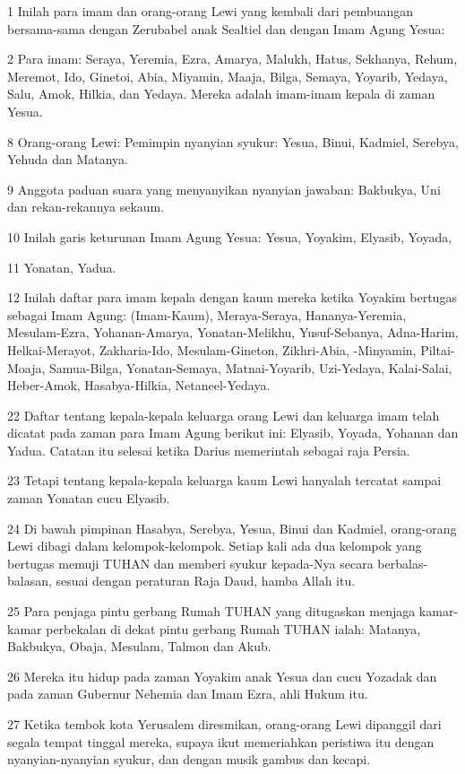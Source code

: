 \par 1 Inilah para imam dan orang-orang Lewi yang kembali dari pembuangan bersama-sama dengan Zerubabel anak Sealtiel dan dengan Imam Agung Yesua:
\par 2 Para imam: Seraya, Yeremia, Ezra, Amarya, Malukh, Hatus, Sekhanya, Rehum, Meremot, Ido, Ginetoi, Abia, Miyamin, Maaja, Bilga, Semaya, Yoyarib, Yedaya, Salu, Amok, Hilkia, dan Yedaya. Mereka adalah imam-imam kepala di zaman Yesua.
\par 8 Orang-orang Lewi: Pemimpin nyanyian syukur: Yesua, Binui, Kadmiel, Serebya, Yehuda dan Matanya.
\par 9 Anggota paduan suara yang menyanyikan nyanyian jawaban: Bakbukya, Uni dan rekan-rekannya sekaum.
\par 10 Inilah garis keturunan Imam Agung Yesua: Yesua, Yoyakim, Elyasib, Yoyada,
\par 11 Yonatan, Yadua.
\par 12 Inilah daftar para imam kepala dengan kaum mereka ketika Yoyakim bertugas sebagai Imam Agung: (Imam-Kaum), Meraya-Seraya, Hananya-Yeremia, Mesulam-Ezra, Yohanan-Amarya, Yonatan-Melikhu, Yusuf-Sebanya, Adna-Harim, Helkai-Merayot, Zakharia-Ido, Mesulam-Gineton, Zikhri-Abia, -Minyamin, Piltai-Moaja, Samua-Bilga, Yonatan-Semaya, Matnai-Yoyarib, Uzi-Yedaya, Kalai-Salai, Heber-Amok, Hasabya-Hilkia, Netaneel-Yedaya.
\par 22 Daftar tentang kepala-kepala keluarga orang Lewi dan keluarga imam telah dicatat pada zaman para Imam Agung berikut ini: Elyasib, Yoyada, Yohanan dan Yadua. Catatan itu selesai ketika Darius memerintah sebagai raja Persia.
\par 23 Tetapi tentang kepala-kepala keluarga kaum Lewi hanyalah tercatat sampai zaman Yonatan cucu Elyasib.
\par 24 Di bawah pimpinan Hasabya, Serebya, Yesua, Binui dan Kadmiel, orang-orang Lewi dibagi dalam kelompok-kelompok. Setiap kali ada dua kelompok yang bertugas memuji TUHAN dan memberi syukur kepada-Nya secara berbalas-balasan, sesuai dengan peraturan Raja Daud, hamba Allah itu.
\par 25 Para penjaga pintu gerbang Rumah TUHAN yang ditugaskan menjaga kamar-kamar perbekalan di dekat pintu gerbang Rumah TUHAN ialah: Matanya, Bakbukya, Obaja, Mesulam, Talmon dan Akub.
\par 26 Mereka itu hidup pada zaman Yoyakim anak Yesua dan cucu Yozadak dan pada zaman Gubernur Nehemia dan Imam Ezra, ahli Hukum itu.
\par 27 Ketika tembok kota Yerusalem diresmikan, orang-orang Lewi dipanggil dari segala tempat tinggal mereka, supaya ikut memeriahkan peristiwa itu dengan nyanyian-nyanyian syukur, dan dengan musik gambus dan kecapi.
